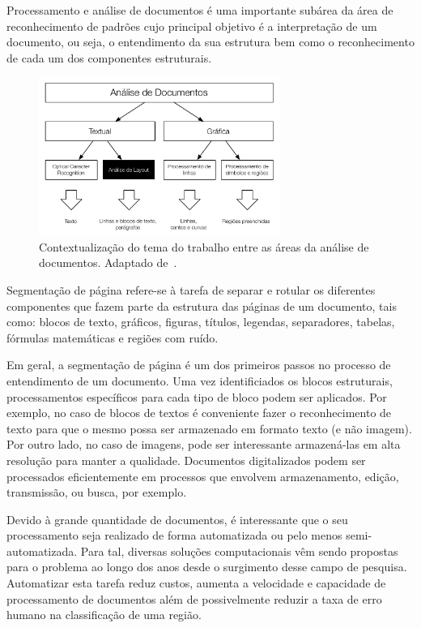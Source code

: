 \documentclass[a4paper,11pt]{article}
\begin{document}
Processamento e análise de documentos é uma importante subárea da área
de reconhecimento de padrões cujo principal objetivo é a
interpretação de um documento, ou seja, o entendimento
da sua estrutura bem como o reconhecimento de cada um dos
componentes estruturais.

\begin{figure}[htb]
\begin{center}
\includegraphics[width=0.7\textwidth]{assets/document_processing_areas_hierarquies.pdf}
\end{center}
\caption{Contextualização do tema do trabalho entre as áreas da
  análise de documentos. Adaptado de~\cite{Kasturi_OGorman_Govindaraju_2002}.}
\label{fig:context1}
\end{figure}

Segmentação de página refere-se à tarefa de separar e rotular os diferentes
componentes que fazem parte da estrutura das páginas de um
documento, tais como: blocos de texto, gráficos, figuras, títulos,
legendas, separadores, tabelas, fórmulas matemáticas e regiões com
ruído.

Em geral, a segmentação de página é um dos primeiros passos no
processo de entendimento de um documento. Uma vez identificiados os
blocos estruturais, processamentos específicos para cada tipo de bloco
podem ser aplicados. Por exemplo, no caso de blocos de textos é
conveniente fazer o reconhecimento de texto para que o mesmo possa ser
armazenado em formato texto (e não imagem). Por outro lado, no caso de
imagens, pode ser interessante armazená-las em alta resolução para
manter a qualidade. Documentos digitalizados podem ser processados
eficientemente em processos que envolvem armazenamento, edição,
transmissão, ou busca, por exemplo.

Devido à grande quantidade de documentos, é interessante que o seu
processamento seja realizado de forma automatizada ou pelo menos
semi-automatizada. Para tal, diversas soluções computacionais vêm
sendo propostas para o problema ao longo dos anos desde o surgimento
desse campo de pesquisa. Automatizar esta tarefa reduz custos, aumenta
a velocidade e capacidade de processamento de documentos além de
possivelmente reduzir a taxa de erro humano na classificação de uma
região.
\end{document}
